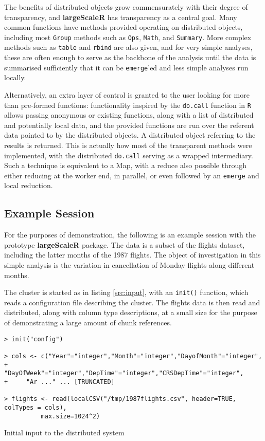 The benefits of distributed objects grow commensurately with their degree of transparency, and \textbf{largeScaleR} has transparency as a central goal.
Many common functions have methods provided operating on distributed objects, including most \texttt{Group} methods such as \texttt{Ops}, \texttt{Math}, and \texttt{Summary}.
More complex methods such as \texttt{table} and \texttt{rbind} are also given, and for very simple analyses, these are often enough to serve as the backbone of the analysis until the data is summarised sufficiently that it can be \texttt{emerge}'ed and less simple analyses run locally.

Alternatively, an extra layer of control is granted to the user looking for more than pre-formed functions:
functionality inspired by the \texttt{do.call} function in \texttt{R} allows passing anonymous or existing functions, along with a list of distributed and potentially local data, and the provided functions are run over the referent data pointed to by the distributed objects.
A distributed object referring to the results is returned.
This is actually how most of the transparent methods were implemented, with the distributed \texttt{do.call} serving as a wrapped intermediary.
Such a technique is equivalent to a Map, with a reduce also possible through either reducing at the worker end, in parallel, or even followed by an \texttt{emerge} and local reduction\cite{mccool2012structured}.

\subsection{Example Session}

For the purposes of demonstration, the following is an example session with the prototype \textbf{largeScaleR} package.
The data is a subset of the flights dataset, including the latter months of the 1987 flights.
The object of investigation in this simple analysis is the variation in cancellation of Monday flights along different months.

The cluster is started as in listing \ref{src:input}, with an \texttt{init()} function, which reads a configuration file describing the cluster.
The flights data is then read and distributed, along with column type descriptions, at a small size for the purpose of demonstrating a large amount of chunk references.
\begin{listing}[H]
\begin{verbatim}
> init("config")

> cols <- c("Year"="integer","Month"="integer","DayofMonth"="integer",
+ 	  "DayOfWeek"="integer","DepTime"="integer","CRSDepTime"="integer",
+ 	  "Ar ..." ... [TRUNCATED]

> flights <- read(localCSV("/tmp/1987flights.csv", header=TRUE, colTypes = cols),
		  max.size=1024^2)
\end{verbatim}
\caption{Initial input to the distributed system}\label{src:input}
\end{listing}

